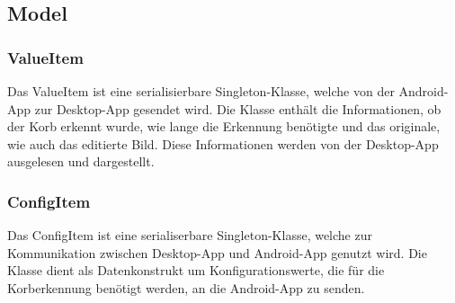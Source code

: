 \subsection{Model}

\subsubsection{ValueItem}
Das ValueItem ist eine serialisierbare Singleton-Klasse, welche von der Android-App 
zur Desktop-App gesendet wird. Die Klasse enthält die Informationen, ob der Korb 
erkennt wurde, wie lange die Erkennung benötigte und das originale, wie auch das editierte Bild. 
Diese Informationen werden von der Desktop-App ausgelesen und dargestellt. 

\subsubsection{ConfigItem}
Das ConfigItem ist eine serialiserbare Singleton-Klasse, welche zur Kommunikation 
zwischen Desktop-App und Android-App genutzt wird. Die Klasse dient als Datenkonstrukt 
um Konfigurationswerte, die für die Korberkennung benötigt werden, an die Android-App zu senden.

            
            
